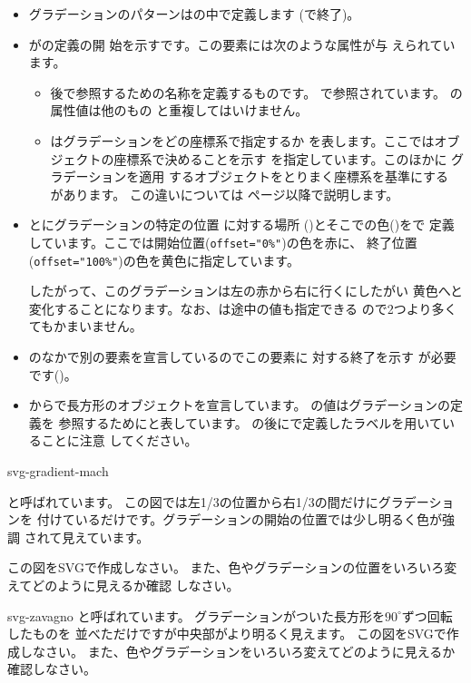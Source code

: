 \begin{itemize}
 \item グラデーションのパターンはの中で定義します
       (で終了)。
 \item {}がの定義の開
       始を示すです。この要素には次のような属性が与
       えられています。
\begin{itemize}
 \item {} 後で参照するための名称を定義するものです。
       で参照されています。 の属性値は他のもの
       と重複してはいけません。
 \item {} はグラデーションをどの座標系で指定するか
       を表します。ここではオブジェクトの座標系で決めることを示す
        を指定しています。このほかに
       グラデーションを適用
       するオブジェクトをとりまく座標系を基準にする
        があります。
この違いについては
       \pageref{diff-gradientUnits}ページ以降で説明します。
\end{itemize}
 \item {}とにグラデーションの特定の位置
       に対する場所
       ()とそこでの色()をで
       定義しています。ここでは開始位置(\texttt{offset="0\%"})の色を赤に、
       終了位置(\texttt{offset="100\%"})の色を黄色に指定しています。

       したがって、このグラデーションは左の赤から右に行くにしたがい
       黄色へと変化することになります。なお、は途中の値も指定できる
       ので2つより多くてもかまいません。
 \item {}のなかで別の要素を宣言しているのでこの要素に
       対する終了を示す が必要です()。
 \item {}からで長方形のオブジェクトを宣言しています。
         の値はグラデーションの定義を 
       参照するためにと表しています。
       \Showattrib{\#}の後にで定義したラベルを用いていることに注意
       してください。
\end{itemize}
{svg-gradient-mach}
{と呼ばれています。
この図では左1/3の位置から右1/3の間だけにグラデーションを
付けているだけです。グラデーションの開始の位置では少し明るく色が強調
されて見えています。
\par
この図をSVGで作成しなさい。
また、色やグラデーションの位置をいろいろ変えてどのように見えるか確認
しなさい。} 
%
{svg-zavagno}
{と呼ばれています。
グラデーションがついた長方形を$90^{\circ}$ずつ回転したものを
並べただけですが中央部がより明るく見えます。
この図をSVGで作成しなさい。
また、色やグラデーションをいろいろ変えてどのように見えるか確認しなさい。}
